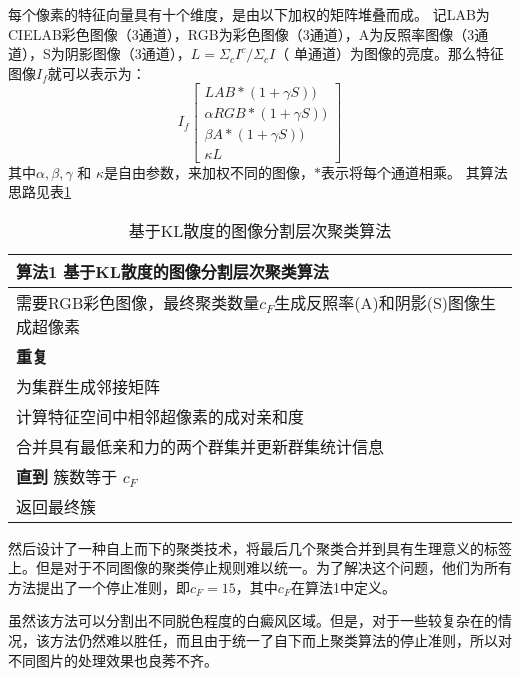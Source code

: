 每个像素的特征向量具有十个维度，是由以下加权的矩阵堆叠而成。 记LAB为CIELAB彩色图像（3通道），RGB为彩色图像（3通道），A为反照率图像（3通道），S为阴影图像（3通道），$L=\Sigma_cI^c/\Sigma_cI$（ 单通道）为图像的亮度。那么特征图像$I_f$就可以表示为：
\begin{equation}
\label{eq:2}
I_f
\begin{bmatrix}
LAB*(1+\gamma S))\\ 
\alpha RGB*(1+\gamma S))\\ 
\beta A*(1+\gamma S))\\ 
\kappa L
\end{bmatrix}
\end{equation}
其中$\alpha,\beta,\gamma$ 和 $\kappa$是自由参数，来加权不同的图像，$*$表示将每个通道相乘。 其算法思路见表\ref{tab:addlabel}
\begin{table}[htbp]
  \centering
   \caption{基于KL散度的图像分割层次聚类算法}
    \begin{tabular}{l}
    \toprule
    \textbf{算法1} 基于KL散度的图像分割层次聚类算法 \\
    \midrule
    \multicolumn{1}{p{28.2em}}{需要RGB彩色图像，最终聚类数量$c_F$生成反照率(A)和阴影(S)图像生成超像素} \\
    \textbf{重复} \\
    \hspace{1em}为集群生成邻接矩阵 \\
    \hspace{1em}计算特征空间中相邻超像素的成对亲和度 \\
     \hspace{1em}合并具有最低亲和力的两个群集并更新群集统计信息 \\
    \textbf{直到} 簇数等于 $c_F$ \\
    返回最终簇 \\
    \bottomrule
    \end{tabular}%
   
  \label{tab:addlabel}%
\end{table}%

然后设计了一种自上而下的聚类技术，将最后几个聚类合并到具有生理意义的标签上。但是对于不同图像的聚类停止规则难以统一。为了解决这个问题，他们为所有方法提出了一个停止准则，即$c_F = 15$，其中$c_F$在算法1中定义。

虽然该方法可以分割出不同脱色程度的白癜风区域。但是，对于一些较复杂在的情况，该方法仍然难以胜任，而且由于统一了自下而上聚类算法的停止准则，所以对不同图片的处理效果也良莠不齐。


